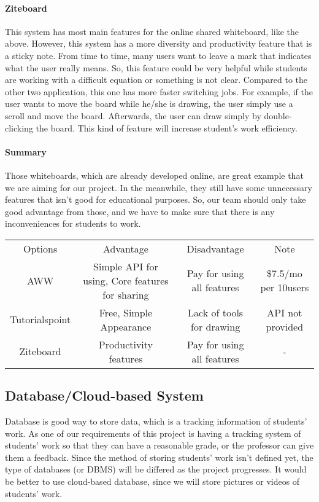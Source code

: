 \documentclass[10pt]{article}
\begin{document}
            \paragraph{Ziteboard}
                This system has most main features for the online shared whiteboard, like the above. However, this system has a more diversity and productivity feature that is a sticky note. From time to time, many users want to leave a mark that indicates what the user really means. So, this feature could be very helpful while students are working with a difficult equation or something is not clear. Compared to the other two application, this one has more faster switching jobs. For example, if the user wants to move the board while he/she is drawing, the user simply use a scroll and move the board. Afterwards, the user can draw simply by double-clicking the board. This kind of feature will increase student’s work efficiency. \cite{Zite}
        
            \paragraph{Summary}
                Those whiteboards, which are already developed online, are great example that we are aiming for our project. In the meanwhile, they still have some unnecessary features that isn’t good for educational purposes. So, our team should only take good advantage from those, and we have to make sure that there is any inconveniences for students to work.

                \begin{center}
                \begin{tabular}{ |c|c|c|c| } \hline
                     Options & Advantage & Disadvantage & Note \\ 
                     AWW & Simple API for using, Core features for sharing & Pay for using all features & \$7.5/mo per 10users  \\ 
                     Tutorialspoint & Free, Simple Appearance & Lack of tools for drawing & API not provided\\ 
                     Ziteboard & Productivity features & Pay for using all features & -\\ 
                     \hline
                \end{tabular}
                \end{center}
        
        \subsection{Database/Cloud-based System}
            Database is good way to store data, which is a tracking information of students’ work. As one of our requirements of this project is having a tracking system of students’ work so that they can have a reasonable grade, or the professor can give them a feedback. Since the method of storing students’ work isn’t defined yet, the type of databases (or DBMS) will be differed as the project progresses. It would be better to use cloud-based database, since we will store pictures or videos of students’ work.
        
\end{document}
